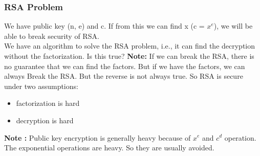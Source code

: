 \documentclass[11pt]{article}
\begin{document}
\subsubsection{RSA Problem}
We have public key (n, e) and c. If from this we can find x (c = $x^e$), we will be able to break security of RSA.\\
We have an algorithm to solve the RSA problem, i.e., it can find the decryption without the factorization. Is this true?
\textbf{Note:} If we can break the RSA, there is no guarantee that we can find the factors. But if we have the factors, we can always Break the RSA. But the reverse is not always true. So RSA is secure under two assumptions:
\begin{itemize}
    \item factorization is hard
    \item decryption is hard
\end{itemize}
\textbf{Note : } Public key encryption is generally heavy because of $x^e$ and $c^d$ operation. The exponential operations are heavy. So they are usually avoided.\\
\end{document}
